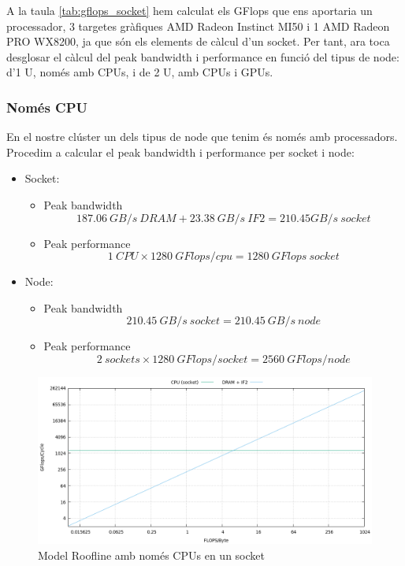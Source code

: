 A la taula \ref{tab:gflops_socket} hem calculat els GFlops que ens aportaria un processador, 3 targetes gràfiques AMD Radeon Instinct MI50 i 1 AMD Radeon PRO WX8200, ja que són els elements de càlcul d'un socket. Per tant, ara toca desglosar el càlcul del peak bandwidth i performance en funció del tipus de node: d'1 U, només amb CPUs, i de 2 U, amb CPUs i GPUs.

\subsubsection{Només CPU}
En el nostre clúster un dels tipus de node que tenim és només amb processadors. Procedim a calcular el peak bandwidth i performance per socket i node:

\begin{itemize}
    \item Socket:
        \begin{itemize}
            \item Peak bandwidth
                \[187.06\ GB/s\ DRAM + 23.38\ GB/s\ IF2 = 210.45 GB/s\ socket\]
            \item Peak performance
        \[ 1\ CPU \times 1280\ GFlops/cpu = 1280\ GFlops\ socket\]
        \end{itemize}
    \item Node:
        \begin{itemize}
            \item Peak bandwidth
                \[210.45\ GB/s\ socket = 210.45\ GB/s\ node\]
            \item Peak performance
\[2\ sockets \times 1280\ GFlops/socket = 2560\ GFlops/node\]
        \end{itemize}
\end{itemize}

\begin{figure}[H]
    \centering
    \includegraphics[width=\textwidth]{entregable/img/roofline_cpus_dram}
    \caption{Model Roofline amb només CPUs en un socket}
    \label{fig:summary}
\end{figure}


